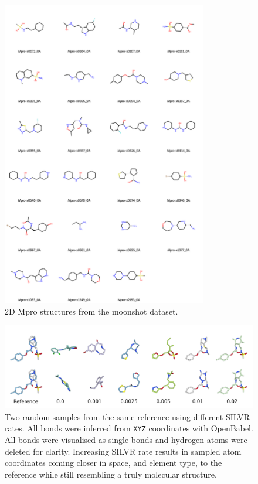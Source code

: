 \documentclass[journal=jacsat,manuscript=article]{achemso}
\begin{document}
\begin{suppinfo}
\begin{figure}
    \centering
    \includegraphics[width=0.8\textwidth]{paper/Figures/FigS1/mpro_ligands_grid_2d.png}
    \caption{2D Mpro structures from the moonshot dataset.}
    \label{fig:fragments}
\end{figure}
\newpage

\begin{figure}[hb!]
    \centering
    \includegraphics[width=\textwidth]{paper/Figures/FigS2/fig_2_sample_vs_rate.png}
    \caption{Two random samples from the same reference using different SILVR rates. All bonds were inferred from \texttt{XYZ} coordinates with OpenBabel. All bonds were visualised as single bonds and hydrogen atoms were deleted for clarity. Increasing SILVR rate results in sampled atom coordinates coming closer in space, and element type, to the reference while still resembling a truly molecular structure.}
    \label{fig:fig_2}
\end{figure}


\end{suppinfo}
\end{document}
